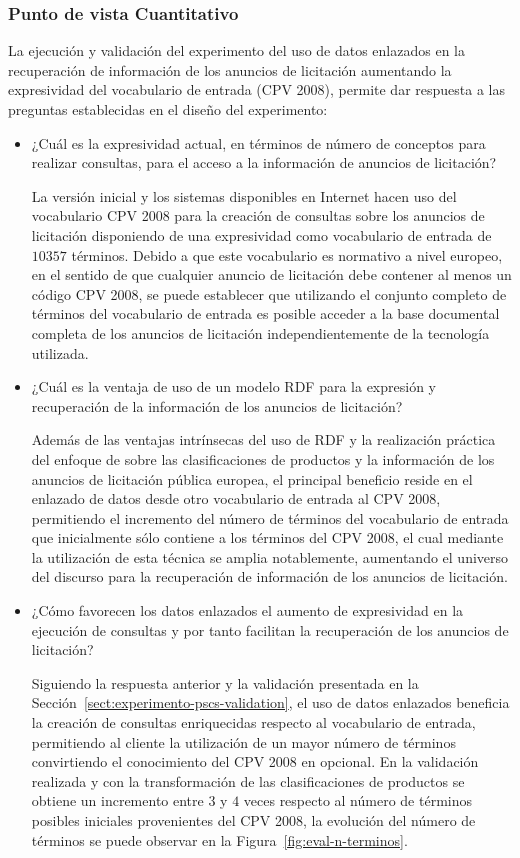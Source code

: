 \subsubsection{Punto de vista Cuantitativo}
La ejecución y validación del experimento del uso de datos enlazados en la recuperación de información de 
los anuncios de licitación aumentando la expresividad del vocabulario de entrada (\gls{CPV} 2008), permite 
dar respuesta a las preguntas establecidas en el diseño del experimento:
\newpage
\begin{itemize}
 \item ¿Cuál es la expresividad actual, en términos de número de conceptos para realizar consultas, 
para el acceso a la información de anuncios de licitación?

La versión inicial y los sistemas disponibles en Internet hacen uso del vocabulario CPV 2008 para la creación de consultas 
sobre los anuncios de licitación disponiendo de una expresividad como vocabulario de entrada de $10357$ términos. Debido 
a que este vocabulario es normativo a nivel europeo, en el sentido de que cualquier anuncio de licitación debe 
contener al menos un código CPV 2008, se puede establecer que utilizando el conjunto completo de términos del vocabulario 
de entrada es posible acceder a la base documental completa de los anuncios de licitación independientemente de la tecnología 
utilizada.

\item ¿Cuál es la ventaja de uso de un modelo \gls{RDF} para la expresión y recuperación de la información de los anuncios de licitación?

Además de las ventajas intrínsecas del uso de RDF y la realización práctica del enfoque de \linkeddata sobre las clasificaciones 
de productos y la información de los anuncios de licitación pública europea, el principal beneficio reside en el enlazado de datos 
desde otro vocabulario de entrada al CPV 2008, permitiendo el incremento del número de términos del vocabulario de entrada que inicialmente 
sólo contiene a los términos del CPV 2008, el cual mediante la utilización de esta técnica se amplia notablemente, aumentando el universo del discurso para 
la recuperación de información de los anuncios de licitación. 

 \item ¿Cómo favorecen los datos enlazados el aumento de expresividad en la ejecución de consultas y por tanto facilitan la recuperación de los 
anuncios de licitación? 

Siguiendo la respuesta anterior y la validación presentada en la Sección~\ref{sect:experimento-pscs-validation}, el uso 
de datos enlazados beneficia la creación de consultas enriquecidas respecto al vocabulario de entrada, permitiendo al cliente la utilización 
de un mayor número de términos convirtiendo el conocimiento del CPV 2008 en opcional. En la validación realizada y con la transformación 
de las clasificaciones de productos se obtiene un incremento entre $3$ y $4$ veces respecto al 
número de términos posibles iniciales provenientes del CPV 2008, la evolución del número de términos se puede observar en 
la Figura~\ref{fig:eval-n-terminos}.


\end{itemize}

